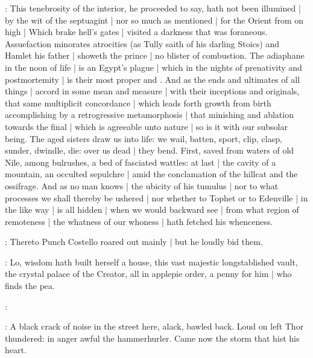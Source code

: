 :
This tenebrosity of the interior,
he proceeded to say,
hath not been illumined |
by the wit of the septuagint |
nor so much as mentioned |
for the Orient from on high |
Which brake hell's gates |
visited a darkness that was foraneous.
Assuefaction minorates atrocities
(as Tully saith of his darling Stoics)
and Hamlet his father |
showeth the prince |
no blister of combustion.
The adiaphane in the noon of life |
is an Egypt's plague |
which in the nights of prenativity and postmortemity |
is their most proper  and .
And as the ends and ultimates of all things |
accord in some mean and measure |
with their inceptions and originals,
that same multiplicit concordance |
which leads forth growth from birth
accomplishing by a retrogressive metamorphosis |
that minishing and ablation towards the final |
which is agreeable unto nature |
so is it with our subsolar being.
The aged sisters draw us into life:
we wail,
batten,
sport,
clip,
clasp,
sunder,
dwindle,
die:
over us dead |
they bend.
First,
saved from waters of old Nile,
among bulrushes,
a bed of fasciated wattles:
at last |
the cavity of a mountain,
an occulted sepulchre |
amid the conclamation of the hillcat and the ossifrage.
And as no man knows |
the ubicity of his tumulus |
nor to what processes we shall thereby be ushered |
nor whether to Tophet or to Edenville |
in the like way |
is all hidden |
when we would backward see |
from what region of remoteness |
the whatness of our whoness |
hath fetched his whenceness.


:
Thereto Punch Costello roared out mainly  |
but he loudly bid them.

\stephen:
Lo,
wisdom hath built herself a house,
this vast majestic longstablished vault,
the crystal palace of the Creator,
all in applepie order,
a penny for him |
who finds the pea.

\stephen:



:
A black crack of noise in the street here,
alack,
bawled back.
Loud on left Thor thundered:
in anger awful the hammerhurler.
Came now the storm that hist his heart.


